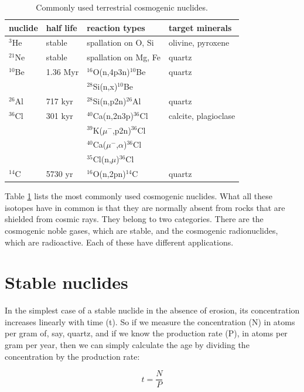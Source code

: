 \documentclass{book}
\begin{document}
\begin{table}[!ht]
\centering
\begin{tabular}{l@{~}l@{~}l@{~}l}
nuclide & half life & reaction types & target minerals \\
\hline
$^3$He & stable & spallation on O, Si & olivine, pyroxene \\
$^{21}$Ne & stable & spallation on Mg, Fe & quartz \\
$^{10}$Be & 1.36 Myr & $^{16}$O(n,4p3n)$^{10}$Be & quartz \\
~ & ~ & $^{28}$Si(n,x)$^{10}$Be & ~ \\
$^{26}$Al & 717 kyr & $^{28}$Si(n,p2n)$^{26}$Al & quartz\\
$^{36}$Cl & 301 kyr & $^{40}$Ca(n,2n3p)$^{36}$Cl & calcite, plagioclase\\
~ & ~ & $^{39}$K($\mu^-$,p2n)$^{36}$Cl & ~ \\
~ & ~ & $^{40}$Ca($\mu^-$,$\alpha$)$^{36}$Cl & ~ \\
~ & ~ & $^{35}$Cl(n,$\mu$)$^{36}$Cl & ~ \\
$^{14}$C & 5730 yr & $^{16}$O(n,2pn)$^{14}$C & quartz\\
\end{tabular}
\caption{Commonly used terrestrial cosmogenic nuclides.}
\label{tab:cosmo}
\end{table}

Table \ref{tab:cosmo} lists the most commonly used cosmogenic
nuclides. What all these isotopes have in common is that they are
normally absent from rocks that are shielded from cosmic rays. They
belong to two categories. There are the cosmogenic noble gases, which
are stable, and the cosmogenic radionuclides, which are
radioactive. Each of these have different applications.

\section{Stable nuclides}

In the simplest case of a stable nuclide in the absence of erosion,
its concentration increases linearly with time (t). So if we measure
the concentration (N) in atoms per gram of, say, quartz, and if we
know the production rate (P), in atoms per gram per year, then we can
simply calculate the age by dividing the concentration by the
production rate:

\begin{equation}
t = \frac{N}{P}
\label{eq:cosmo-exposure}
\end{equation}
\end{document}
